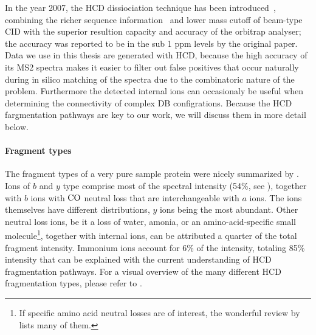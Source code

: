 In the year 2007, the HCD dissiociation technique has been introduced~\cite{olsen2007higher}, combining the richer sequence information~\cite{xia2006ion} and lower mass cutoff of beam-type CID with the superior resultion capacity and accuracy of the orbitrap analyser; the accuracy was reported to be in the sub 1 ppm levels by the original paper. Data we use in this thesis are generated with HCD\@, because the high accuracy of its MS2 spectra makes it easier to filter out false positives that occur naturally during in silico matching of the spectra due to the combinatoric nature of the problem. Furthermore the detected internal ions can occasionaly be useful when determining the connectivity of complex DB configrations. Because the HCD fargmentation pathways are key to our work, we will discuss them in more detail below.

\paragraph{Fragment types} The fragment types of a very pure sample protein were nicely summarized by \citet{michalski2012systematic}. Ions of \(b\) and \(y\) type comprise most of the spectral intensity (54\%, see ), together with \(b\) ions with \(\ce{CO}\) neutral loss that are interchangeable with \(a\) ions. The ions themselves have different distributions, \(y\) ions being the most abundant. Other neutral loss ions, be it a loss of water, amonia, or an amino-acid-specific small molecule\footnote{If specific amino acid neutral losses are of interest, the wonderful review by~\cite{paizs2005fragmentation} lists many of them.}, together with internal ions, can be attributed a quarter of the total fragment intensity. Immonium ions account for 6\% of the intensity, totaling 85\% intensity that can be explained with the current understanding of HCD fragmentation pathways. For a visual overview of the many different HCD fragmentation types, please refer to .

